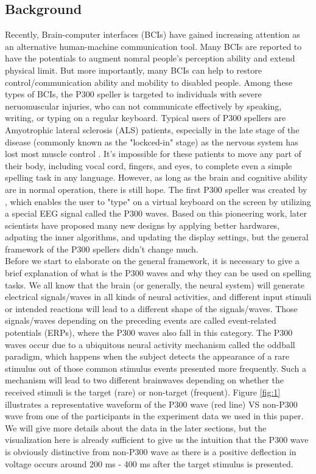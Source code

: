 \documentclass{article}
\begin{document}
\subsection{Background} \label{Background}
Recently, Brain-computer interfaces (BCIs) have gained increasing attention as an alternative human-machine communication tool. Many BCIs are reported to have the potentials to augment nomral people's perception ability and extend physical limit. But more importantly, many BCIs can help to restore control/communication ability and mobility to disabled people. Among these types of BCIs, the P300 speller is targeted to individuals with severe neruomuscular injuries, who can not communicate effectively by speaking, writing, or typing on a regular keyboard. Typical users of P300 spellers are Amyotrophic lateral sclerosis (ALS) patients, especially in the late stage of the disease (commonly known as the "lockced-in" stage) as the nervous system has lost most muscle control \cite{moghimi2013review}. It's impossible for these patients to move any part of their body, including vocal cord, fingers, and eyes, to complete even a simple spelling task in any language. However, as long as the brain and cognitive ability are in normal operation, there is still hope. The first P300 speller was created by \cite{farwell1988talking}, which enables the user to "type" on a virtual keyboard on the screen by utilizing a special EEG signal called the P300 waves. Based on this pioneering work, later scientists have proposed many new designs by applying better hardwares, adpating the inner algorithms, and updating the display settings, but the general framework of the P300 spellers didn't change much.\\

\vspace{-3mm}
Before we start to elaborate on the general framework, it is necessary to give a brief explanation of what is the P300 waves and why they can be used on spelling tasks. We all know that the brain (or generally, the neural system) will generate electrical signals/waves in all kinds of neural activities, and different input stimuli or intended reactions will lead to a different shape of the signals/waves. Those signals/waves depending on the preceding events are called event-related potentials (ERPs), where the P300 waves also fall in this category. The P300 waves occur due to a ubiquitous neural activity mechanism called the oddball paradigm, which happens when the subject detects the appearance of a rare stimulus out of those common stimulus events presented more frequently. Such a mechanism will lead to two different brainwaves depending on whether the received stimuli is the target (rare) or non-target (frequent). Figure \ref{fig:1} illustrates a representative waveform of the P300 wave (red line) VS non-P300 wave from one of the participants in the experiment data we used in this paper. We will give more details about the data in the later sections, but the visualization here is already sufficient to give us the intuition that the P300 wave is obviously distinctive from non-P300 wave as there is a positive deflection in voltage occurs around 200 ms - 400 ms after the target stimulus is presented.
\end{document}
